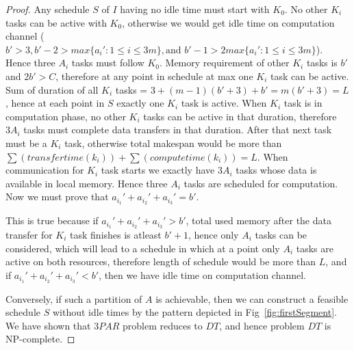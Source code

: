 \documentclass[sigconf]{acmart}
\begin{document}
\begin{proof}
		Any schedule $S$ of $I$ having no idle time must start with $K_0$. No other $K_i$ tasks can be active with $K_0$, otherwise we would get idle time on computation channel ($b'>3, b'-2>max\{a_i':1\le i\le 3m\},  \text{and } b'-1 > 2 max\{a_i':1\le i\le 3m\}$). Hence three $A_i$ tasks must follow $K_0$.   	 
		Memory requirement of other $K_i$ tasks is $b'$ and $2b'>C$, therefore at any point in schedule at max one $K_i$ task can be active. Sum of duration of all $K_i$ tasks = $3 + (m-1)(b'+3) + b' = m (b'+3)=L$, hence at each point in $S$ exactly one $K_i$ task is active. When $K_i$ task is in computation phase, no other $K_i$ tasks can be active in that duration, therefore  $3A_i$ tasks must complete data transfers in that duration. After that next task must be a 
		$K_i$ task, otherwise total makespan would be more than $\sum(transfertime(k_i))  + 
		\sum(computetime(k_i)) =L$. When communication for  $K_i$ task starts we exactly have $3A_i$ 
		tasks whose data is available in local memory. Hence three $A_i$ tasks are scheduled for computation. Now we must prove that $a_{i_1}' + a_{i_2}'  + a_{i_3}'  = b'$.
		
		This is true because if $a_{i_1}' + a_{i_2}'  + a_{i_3}'  > b'$, total used memory after the data transfer 
		for  $K_i$ task finishes is atleast $b'+1$, hence only $A_i$ tasks can be considered, which will lead to a schedule in which at a point only $A_i$ tasks are active on both resources, therefore length of 
		schedule would be more than $L$, and if $a_{i_1}' + a_{i_2}'  + a_{i_3}'  < b'$, then we have idle time on computation channel.
		
		Conversely, if such a partition of $A$ is achievable, then we can construct a feasible schedule $S$ 
		without idle times by the pattern depicted in Fig~\ref{fig:firstSegment}. We have shown that $3PAR$ 
		problem reduces to $DT$, and hence problem $DT$ is NP-complete.
		

\end{proof}
\end{document}
